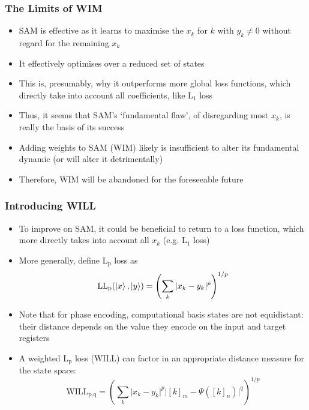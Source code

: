 \documentclass{beamer}
\begin{document}
\begin{frame}
\frametitle{The Limits of WIM}
\begin{itemize}
\item SAM is effective as it learns to maximise the $x_k$ for $k$ with $y_k \neq 0$ without regard for the remaining $x_k$
\item It effectively optimises over a \alert{reduced set of states} 
\item This is, presumably, why it outperforms more global loss functions, which directly take into account all coefficients, like L$_1$ loss 
\item Thus, it seems that SAM's \alert{`fundamental flaw'}, of disregarding most $x_k$, is really the \alert{basis of its success} 
\item Adding weights to SAM (WIM) likely is insufficient to alter its fundamental dynamic (or will alter it detrimentally)  
\item Therefore, \alert{WIM will be abandoned for the foreseeable future}
\end{itemize}
\end{frame}

\begin{frame}
\frametitle{Introducing WILL}
\begin{itemize}
\item To improve on SAM, it could be beneficial to return to a loss function, which more directly takes into account all $x_k$ (e.g. L$_1$ loss)
\item More generally, define \alert{L$_\text{p}$ loss} as 
\begin{equation}
\text{LL}_\text{p} (\ket{x}, \ket{y}) = \left( \sum_k |x_k -y_k|^p \right)^{1/p}
\end{equation}
\item Note that for phase encoding, \alert{computational basis states are not equidistant}: their distance depends on the value they encode on the input and target registers
\item A \alert{weighted L$_\text{p}$ loss (WILL)} can factor in an appropriate distance measure for the state space:
\begin{equation}
\text{WILL}_\text{p,q} =  \left( \sum_k \Big|x_k -y_k \Big|^p \Big|[k]_m - \Psi([k]_n) \Big|^q \right)^{1/p}
\end{equation}
\end{itemize}
\end{frame}
\end{document}
